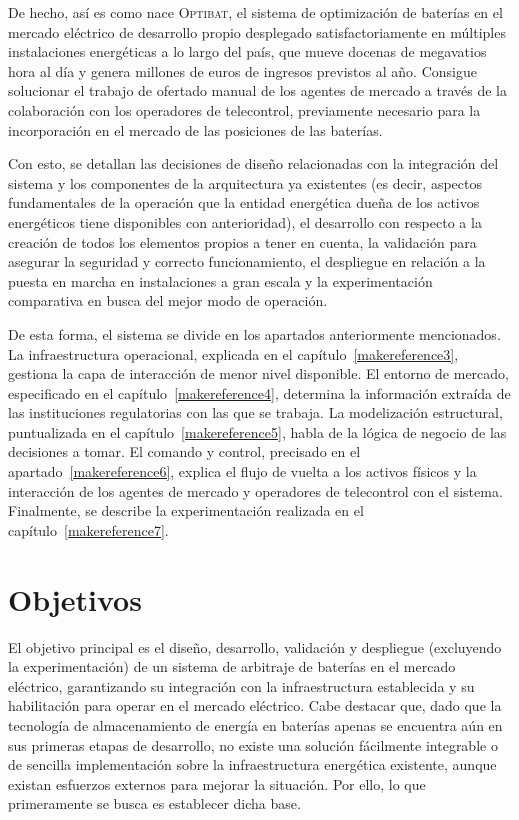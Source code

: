 De hecho, así es como nace \textsc{Optibat}, el sistema de optimización de baterías en el mercado eléctrico de desarrollo propio desplegado satisfactoriamente en múltiples instalaciones energéticas a lo largo del país, que mueve docenas de megavatios hora al día y genera millones de euros de ingresos previstos al año. Consigue solucionar el trabajo de ofertado manual de los agentes de mercado a través de la colaboración con los operadores de telecontrol, previamente necesario para la incorporación en el mercado de las posiciones de las baterías.

Con esto, se detallan las decisiones de diseño relacionadas con la integración del sistema y los componentes de la arquitectura ya existentes (es decir, aspectos fundamentales de la operación que la entidad energética dueña de los activos energéticos tiene disponibles con anterioridad), el desarrollo con respecto a la creación de todos los elementos propios a tener en cuenta, la validación para asegurar la seguridad y correcto funcionamiento, el despliegue en relación a la puesta en marcha en instalaciones a gran escala y la experimentación comparativa en busca del mejor modo de operación.

De esta forma, el sistema se divide en los apartados anteriormente mencionados. La infraestructura operacional, explicada en el capítulo~\ref{makereference3}, gestiona la capa de interacción de menor nivel disponible. El entorno de mercado, especificado en el capítulo~\ref{makereference4}, determina la información extraída de las instituciones regulatorias con las que se trabaja. La modelización estructural, puntualizada en el capítulo~\ref{makereference5}, habla de la lógica de negocio de las decisiones a tomar. El comando y control, precisado en el apartado~\ref{makereference6}, explica el flujo de vuelta a los activos físicos y la interacción de los agentes de mercado y operadores de telecontrol con el sistema. Finalmente, se describe la experimentación realizada en el capítulo~\ref{makereference7}.

\section{Objetivos}
\label{makereference1.1}

El objetivo principal es el diseño, desarrollo, validación y despliegue (excluyendo la experimentación) de un sistema de arbitraje de baterías en el mercado eléctrico, garantizando su integración con la infraestructura establecida y su habilitación para operar en el mercado eléctrico. Cabe destacar que, dado que la tecnología de almacenamiento de energía en baterías apenas se encuentra aún en sus primeras etapas de desarrollo, no existe una solución fácilmente integrable o de sencilla implementación sobre la infraestructura energética existente, aunque existan esfuerzos externos para mejorar la situación. Por ello, lo que primeramente se busca es establecer dicha base.

